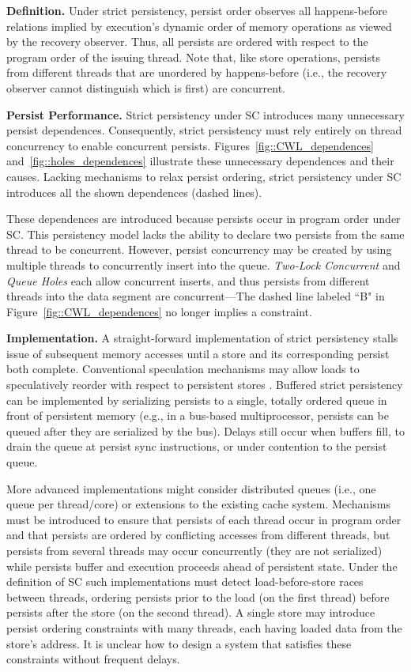 \textbf{Definition.}
Under strict persistency, persist order observes all happens-before relations implied by execution's dynamic order of memory operations as viewed by the recovery observer.
Thus, all persists are ordered with respect to the program order of the issuing thread.
Note that, like store operations, persists from different threads that are unordered by happens-before (i.e., the recovery observer cannot distinguish which is first) are concurrent.

\textbf{Persist Performance.}
Strict persistency under SC introduces many unnecessary persist dependences.
Consequently, strict persistency must rely entirely on thread concurrency to enable concurrent persists.
Figures~\ref{fig::CWL_dependences} and~\ref{fig::holes_dependences} illustrate these unnecessary dependences and their causes.
Lacking mechanisms to relax persist ordering, strict persistency under SC introduces all the shown dependences (dashed lines).

These dependences are introduced because persists occur in program order under SC.
This persistency model lacks the ability to declare two persists from the same thread to be concurrent.
However, persist concurrency may be created by using multiple threads to concurrently insert into the queue.
\emph{Two-Lock Concurrent} and \emph{Queue Holes} each allow concurrent inserts, and thus persists from different threads into the data segment are concurrent---The dashed line labeled ``B" in Figure~\ref{fig::CWL_dependences} no longer implies a constraint.

\textbf{Implementation.}
A straight-forward implementation of strict persistency stalls issue of subsequent memory accesses until a store and its corresponding persist both complete.
Conventional speculation mechanisms may allow loads to speculatively reorder with respect to persistent stores \cite{Gharachorloo91}.
Buffered strict persistency can be implemented by serializing persists to a single, totally ordered queue in front of persistent memory (e.g., in a bus-based multiprocessor, persists can be queued after they are serialized by the bus).
Delays still occur when buffers fill, to drain the queue at persist sync instructions, or under contention to the persist queue.

More advanced implementations might consider distributed queues (i.e., one queue per thread/core) or extensions to the existing cache system.
Mechanisms must be introduced to ensure that persists of each thread occur in program order and that persists are ordered by conflicting accesses from different threads, but persists from several threads may occur concurrently (they are not serialized) while persists buffer and execution proceeds ahead of persistent state.
Under the definition of SC such implementations must detect load-before-store races between threads, ordering persists prior to the load (on the first thread) before persists after the store (on the second thread).
A single store may introduce persist ordering constraints with many threads, each having loaded data from the store's address.
It is unclear how to design a system that satisfies these constraints without frequent delays.

